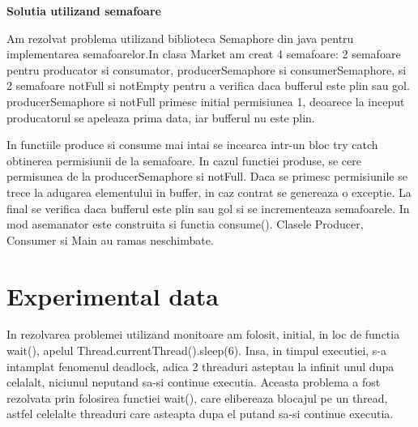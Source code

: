 \documentclass{article}
\begin{document}

\newpage
\vspace{5mm}
{\large \textbf {Solutia utilizand semafoare}}

\hspace{0.5 cm}
Am rezolvat problema utilizand biblioteca Semaphore din java pentru implementarea semafoarelor.In clasa Market am creat 4 semafoare: 2 semafoare pentru producator si consumator, producerSemaphore si consumerSemaphore, si 2 semafoare notFull si notEmpty pentru a verifica daca bufferul este plin sau gol. producerSemaphore si notFull primesc initial permisiunea 1, deoarece la inceput producatorul se apeleaza prima data, iar bufferul nu este plin. 

\hspace{0.5 cm}
In functiile produce si consume mai intai se incearca intr-un bloc try catch obtinerea permisiunii de la semafoare. In cazul functiei produse, se cere permisunea de la producerSemaphore si notFull. Daca se primesc permisiunile se trece la adugarea elementului in buffer, in caz contrat se genereaza o exceptie. La final se verifica daca bufferul este plin sau gol si se incrementeaza semafoarele. In mod asemanator este construita si functia consume(). Clasele Producer, Consumer si Main au ramas neschimbate.

\section{Experimental data}
\hspace{0.5 cm}
In rezolvarea problemei utilizand monitoare am folosit, initial, in loc de functia wait(), apelul Thread.currentThread().sleep(6). Insa, in timpul executiei, s-a intamplat fenomenul deadlock, adica 2 threaduri asteptau la infinit unul dupa celalalt, niciunul neputand sa-si continue executia. Aceasta problema a fost rezolvata prin folosirea functiei wait(), care elibereaza blocajul pe un thread, astfel celelalte threaduri care asteapta dupa el putand sa-si continue executia.
\end{document}
